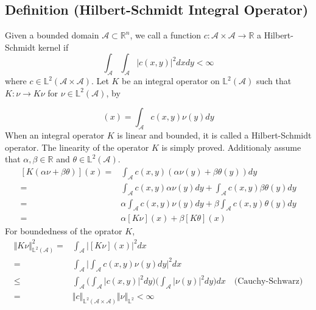\documentclass[11pt,twoside,a4paper]{article}
\begin{document}
	\subsection{Definition (Hilbert-Schmidt Integral Operator)}\label{def_HS}
	Given a bounded domain $\mathcal{A} \subset \mathbb{R}^n$, we call a function $c : \mathcal{A} \times \mathcal{A} \rightarrow \mathbb{R}$ a Hilbert-Schmidt kernel if
	\begin{equation}
		\int_{\mathcal{A}} \int_{\mathcal{A}} \vert c(x,y) \vert ^2 dx dy < \infty
	\end{equation}
	where $c \in \mathbb{L}^2(\mathcal{A} \times \mathcal{A})$. Let $K$ be an integral operator on $\mathbb{L}^2(\mathcal{A})$ such that $K : \nu \rightarrow K \nu$ for $\nu \in \mathbb{L}^2(\mathcal{A})$, by
	
	\begin{equation}
		[K\nu](x) = \int_{\mathcal{A}} c(x,y) \nu(y) dy
	\end{equation}
	When an integral operator $K$ is linear and bounded, it is called a Hilbert-Schmidt operator. The linearity of the operator $K$ is simply proved. Additionaly assume that $\alpha, \beta \in \mathbb{R}$ and $\theta \in \mathbb{L}^2(\mathcal{A})$.
	\begin{equation}
		\begin{split}
			[K (\alpha \nu + \beta \theta)](x) =& \int_{\mathcal{A}} c(x,y)(\alpha \nu(y) + \beta \theta(y)) dy\\
			= & \int_{\mathcal{A}} c(x,y) \alpha \nu(y) dy + \int_{\mathcal{A}} c(x,y) \beta \theta(y) dy\\
			= & \alpha\int_{\mathcal{A}} c(x,y) \nu (y) dy + \beta\int_{\mathcal{A}} c(x,y) \theta (y) dy\\
			= & \alpha[K\nu](x) + \beta[K\theta](x)
		\end{split}
	\end{equation}
	For boundedness of the oprator $K$,
	\begin{equation}
		\begin{split}
			\Vert K\nu \Vert^{2}_{\mathbb{L}^2(\mathcal{A})} = & \int_{\mathcal{A}} \biggl\vert [K\nu](x) \biggr\vert^2 dx\\
			= &\int_{\mathcal{A}} \biggl\vert \int_{\mathcal{A}}c(x,y)\nu(y)dy \biggr\vert^2dx\\
			\leq & \int_{\mathcal{A}}\biggl(\int_{\mathcal{A}}\vert c(x,y) \vert^2dy\biggr) \biggl(\int_{\mathcal{A}}\vert \nu(y) \vert ^2 dy \biggr)dx \quad \text{(Cauchy-Schwarz)}\\
			= & \Vert c \Vert_{\mathbb{L}^2(\mathcal{A} \times \mathcal{A})}\Vert \nu \Vert_{\mathbb{L}^2} < \infty
		\end{split}
	\end{equation}
	
\end{document}
